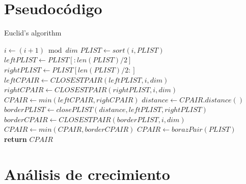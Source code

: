 \documentclass{article}
\begin{document}
\section{Pseudocódigo}
\begin{algorithm}

	\caption{Euclid’s algorithm}

	\label{euclid}

	\begin{algorithmic}[1] %

	  
		\State
			\State
			\State $i\gets(i+1) \bmod dim$
			\State
			\State $PLIST \gets sort(i, PLIST)$
			\State
			\State $leftPLIST \gets PLIST[:len(PLIST)/2]$
			\State
			\State $rightPLIST \gets PLIST[len(PLIST)/2:]$
			\State
			\State $leftCPAIR \gets CLOSESTPAIR(leftPLIST, i, dim)$
			\State
			\State $rightCPAIR \gets CLOSESTPAIR(rightPLIST, i, dim)$
			\State
			\State $CPAIR \gets min(leftCPAIR, righCPAIR)$
			\State
			\State $distance \gets CPAIR.distance()$
			\State
			\State $borderPLIST \gets closePLIST(distance, leftPLIST, rightPLIST)$
			\State
			\State $borderCPAIR \gets CLOSESTPAIR(borderPLIST, i , dim)$
			\State
			\State $CPAIR \gets min(CPAIR, borderCPAIR)$
			\State
		\Else
			\State
			\State $CPAIR \gets borazPair(PLIST)$
			\State
		\EndIf
		\State
		\State \textbf{return} $CPAIR$
	\State
	\EndProcedure

	\end{algorithmic}

\end{algorithm}


\section{Análisis de crecimiento}
\end{document}
